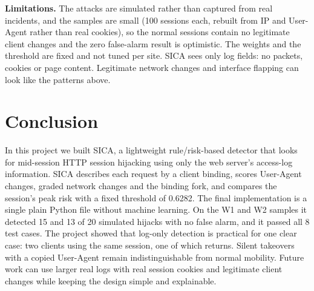 \documentclass[conference]{IEEEtran}
\begin{document}
\textbf{Limitations.} The attacks are simulated rather than captured from real
incidents, and the samples are small (100 sessions each, rebuilt from IP and
User-Agent rather than real cookies), so the normal sessions contain no
legitimate client changes and the zero false-alarm result is optimistic. The
weights and the threshold are fixed and not tuned per site. SICA sees only
log fields: no packets, cookies or page content. Legitimate network changes and
interface flapping can look like the patterns above.

\section{Conclusion}

In this project we built SICA, a lightweight rule/risk-based detector that looks
for mid-session HTTP session hijacking using only the web server's access-log
information. SICA describes each request by a client binding, scores User-Agent
changes, graded network changes and the binding fork, and compares the
session's peak risk with a fixed threshold of 0.6282. The final implementation
is a single plain Python file without machine learning. On the W1 and W2
samples it detected 15 and 13 of 20 simulated hijacks with no false alarm, and
it passed all 8 test cases. The project showed that log-only detection is
practical for one clear case: two clients using the same session, one of which
returns. Silent takeovers with a copied User-Agent remain indistinguishable
from normal mobility. Future work can use larger real logs with real session
cookies and legitimate client changes while keeping the design simple and
explainable.



\end{document}
